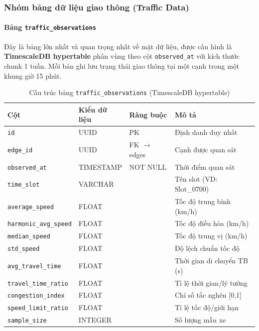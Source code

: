 \subsubsection{Nhóm bảng dữ liệu giao thông (Traffic Data)}

\paragraph{Bảng \texttt{traffic\_observations}}
Đây là bảng lớn nhất và quan trọng nhất về mặt dữ liệu, được cấu hình là \textbf{TimescaleDB hypertable} phân vùng theo cột \texttt{observed\_at} với kích thước chunk 1 tuần. Mỗi bản ghi lưu trạng thái giao thông tại một cạnh trong một khung giờ 15 phút.

\begin{table}[H]
\centering
\caption{Cấu trúc bảng \texttt{traffic\_observations} (TimescaleDB hypertable)}
\begin{tabular}{|l|l|l|p{5cm}|}
\hline
\textbf{Cột} & \textbf{Kiểu dữ liệu} & \textbf{Ràng buộc} & \textbf{Mô tả} \\
\hline
\texttt{id} & UUID & PK & Định danh duy nhất \\
\texttt{edge\_id} & UUID & FK $\to$ edges & Cạnh được quan sát \\
\texttt{observed\_at} & TIMESTAMP & NOT NULL & Thời điểm quan sát \\
\texttt{time\_slot} & VARCHAR & & Tên slot (VD: Slot\_0700) \\
\texttt{average\_speed} & FLOAT & & Tốc độ trung bình (km/h) \\
\texttt{harmonic\_avg\_speed} & FLOAT & & Tốc độ điều hòa (km/h) \\
\texttt{median\_speed} & FLOAT & & Tốc độ trung vị (km/h) \\
\texttt{std\_speed} & FLOAT & & Độ lệch chuẩn tốc độ \\
\texttt{avg\_travel\_time} & FLOAT & & Thời gian di chuyển TB (s) \\
\texttt{travel\_time\_ratio} & FLOAT & & Tỉ lệ thời gian/lý tưởng \\
\texttt{congestion\_index} & FLOAT & & Chỉ số tắc nghẽn [0,1] \\
\texttt{speed\_limit\_ratio} & FLOAT & & Tỉ lệ tốc độ/giới hạn \\
\texttt{sample\_size} & INTEGER & & Số lượng mẫu xe \\
\hline
\end{tabular}
\end{table}

